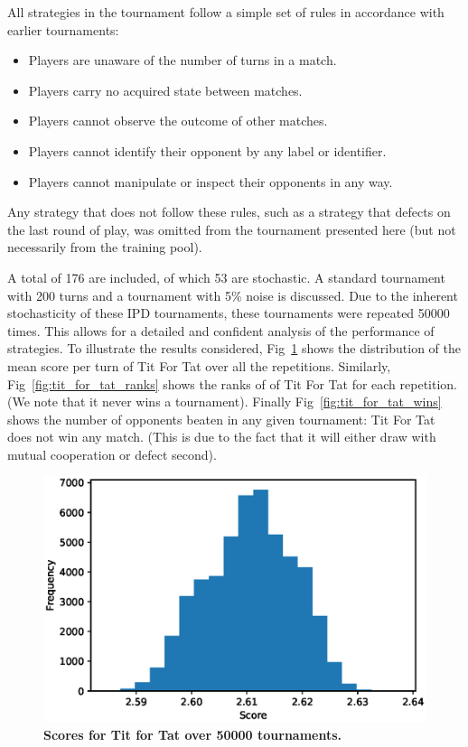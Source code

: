 \documentclass[10pt,letterpaper]{article}
\begin{document}
All strategies in the tournament follow a simple set of
rules in accordance with earlier tournaments:

\begin{itemize}
  \item Players are unaware of the number of turns in a match.
  \item Players carry no acquired state between matches.
  \item Players cannot observe the outcome of other matches.
  \item Players cannot identify their opponent by any label or identifier.
  \item Players cannot manipulate or inspect their opponents in any way.
\end{itemize}

Any strategy that does not follow these rules, such as a strategy that defects
on the last round of play, was omitted from the tournament presented here (but
not necessarily from the training pool).

A total of 176 are included, of which
53 are stochastic.
A standard tournament with 200
turns and a tournament with 5\% noise is
discussed. Due to the inherent stochasticity of these IPD tournaments, these
tournaments were repeated 50000
times. This allows for a detailed and confident analysis of the performance of
strategies. To illustrate the results considered,
Fig~\ref{fig:tit_for_tat_scores} shows the distribution of the mean score per
turn of Tit For Tat over all the repetitions. Similarly,
Fig~\ref{fig:tit_for_tat_ranks} shows the ranks of of Tit For Tat for each
repetition. (We note that it never wins a tournament). Finally
Fig~\ref{fig:tit_for_tat_wins} shows the number of opponents beaten in any given
tournament: Tit For Tat does not win any match. (This is due to the fact that it
will either draw with mutual cooperation or defect second).

\begin{figure}[!hbtp]
        \centering
        \includegraphics[width=.5\textwidth]{standard_tft_scores.eps}
        \caption{\bf Scores for Tit for Tat over
        50000 tournaments.}
        \label{fig:tit_for_tat_scores}
\end{figure}
\end{document}
